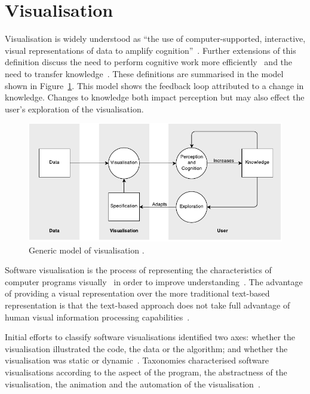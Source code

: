 \section{Visualisation}

Visualisation is widely understood as ``the use of computer-supported, interactive, visual representations of data to amplify cognition''~\cite{Card1999}. Further extensions of this definition discuss the need to perform cognitive work more efficiently~\cite{Ware2013a} and the need to transfer knowledge~\cite{Burkhard}. These definitions are summarised in the model shown in Figure~\ref{fig:model-of-visualisation}. This model shows the feedback loop attributed to a change in knowledge. Changes to knowledge both impact perception but may also effect the user's exploration of the visualisation.

\begin{figure}
  \centering \includegraphics[width=\columnwidth]{../images/diagrams/wijk-model-of-visualisation.pdf}
  \caption[Generic model of visualisation]{Generic model of visualisation \protect\cite{VanWijk2005}.}
\label{fig:model-of-visualisation}
\end{figure}

Software visualisation is the process of representing the characteristics of computer programs visually~\cite{Stasko1992} in order to improve understanding~\cite{Diehl2007}. The advantage of providing a visual representation over the more traditional text-based representation is that the text-based approach does not take full advantage of human visual information processing capabilities~\cite{Myers1989}.

Initial efforts to classify software visualisations identified two axes: whether the visualisation illustrated the code, the data or the algorithm; and whether the visualisation was static or dynamic~\cite{Myers1989}. Taxonomies characterised software visualisations according to the aspect of the program, the abstractness of the visualisation, the animation and the automation of the visualisation~\cite{Stasko1992}.

